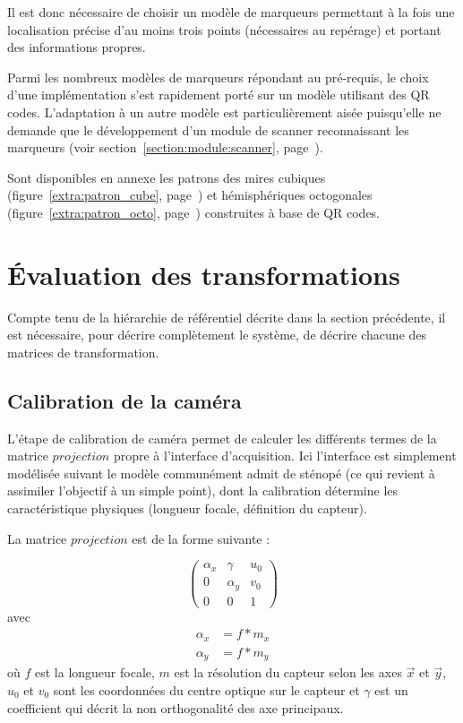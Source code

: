 \documentclass[10pt,a4paper,twoside, twocolumn]{report}
\begin{document}
Il est donc nécessaire de choisir un modèle de marqueurs permettant à la fois une localisation précise d’au moins trois points (nécessaires au repérage) et portant des informations propres.

Parmi les nombreux modèles de marqueurs répondant au pré-requis, le choix d’une implémentation s’est rapidement porté sur un modèle utilisant des QR codes. L’adaptation à un autre modèle est particulièrement aisée puisqu’elle ne demande que le développement d’un module de scanner reconnaissant les marqueurs (voir section~\ref{section:module:scanner}, page~\pageref{section:module:scanner}).

Sont disponibles en annexe les patrons des mires cubiques (figure~\ref{extra:patron_cube}, page~\pageref{extra:patron_cube}) et hémisphériques octogonales (figure~\ref{extra:patron_octo}, page~\pageref{extra:patron_octo}) construites à base de QR codes.



\section{Évaluation des transformations}

Compte tenu de la hiérarchie de référentiel décrite dans la section précédente, il est nécessaire, pour décrire complètement le système, de décrire chacune des matrices de transformation. 


\subsection{Calibration de la caméra}

L’étape de calibration de caméra permet de calculer les différents termes de la matrice $projection$ propre à l’interface d’acquisition. Ici l’interface est simplement modélisée suivant le modèle communément admit de sténopé (ce qui revient à assimiler l’objectif à un simple point), dont la calibration détermine les caractéristique physiques (longueur focale, définition du capteur).

La matrice $projection$ est de la forme suivante :

\begin{equation}
	\begin{pmatrix}
		\alpha_x	&	\gamma		& u_0	\\
		0					&	\alpha_y	&	v_0	\\
		0					&	0					&	1
	\end{pmatrix}
\end{equation}
avec 
\begin{align*}
	\alpha_x	&= f * m_x	\\
	\alpha_y	&= f * m_y
\end{align*}
où $f$ est la longueur focale, $m$ est la résolution du capteur selon les axes $\vec x$ et $\vec y$, $u_0$ et $v_0$ sont les coordonnées du centre optique sur le capteur et $\gamma$ est un coefficient qui décrit la non orthogonalité des axe principaux.
\end{document}
